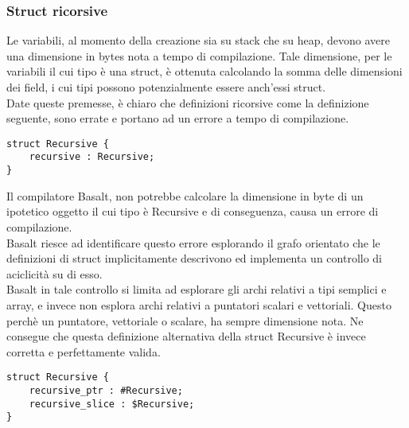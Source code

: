 \subsubsection{Struct ricorsive}
Le variabili, al momento della creazione sia su stack che su heap, devono avere una dimensione 
in bytes nota a tempo di compilazione. Tale dimensione, per le variabili il cui tipo è una struct, 
è ottenuta calcolando la somma delle dimensioni dei field, i cui tipi possono potenzialmente 
essere anch’essi struct. \\ 

Date queste premesse, è chiaro che definizioni ricorsive come la definizione seguente, 
sono errate e portano ad un errore a tempo di compilazione. \\

\vspace{0.5cm}
\begin{lstlisting}[frame=single]
struct Recursive {
    recursive : Recursive;
}
\end{lstlisting}
\vspace{0.5cm}

 
Il compilatore Basalt, non potrebbe calcolare la dimensione in byte di un ipotetico oggetto il cui tipo è 
Recursive e di conseguenza, causa un errore di compilazione. \\ 

Basalt riesce ad identificare questo errore esplorando il grafo orientato che le definizioni di struct implicitamente 
descrivono ed implementa un controllo di aciclicità su di esso. \\

Basalt in tale controllo si limita ad esplorare gli archi relativi a tipi semplici e array, 
e invece non esplora archi relativi a puntatori scalari e vettoriali. Questo perchè un puntatore, 
vettoriale o scalare, ha sempre dimensione nota. Ne consegue che questa definizione alternativa 
della struct Recursive è invece corretta e perfettamente valida. \\

\vspace{0.5cm}
\begin{lstlisting}[frame=single]
struct Recursive {
    recursive_ptr : #Recursive;
    recursive_slice : $Recursive;
}
\end{lstlisting}
\vspace{0.5cm}